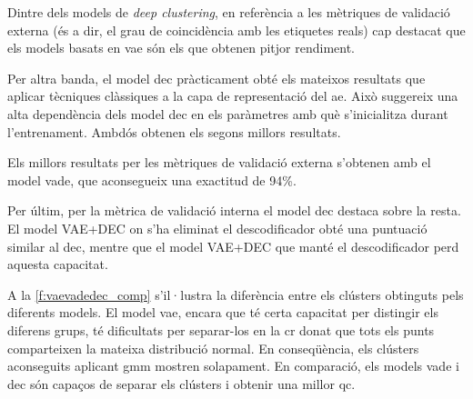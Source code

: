 \documentclass[CAT,BIB]{TFUOC}%
\begin{document}
        Dintre dels models de \textit{deep clustering},
        en referència a les mètriques de validació externa
        (és a dir, el grau de coincidència amb les etiquetes reals)
        cap destacat que els models basats en \gls{vae}
        són els que obtenen pitjor rendiment.

        Per altra banda, el model \gls{dec} pràcticament obté els mateixos resultats
        que aplicar tècniques clàssiques a la capa de representació del \gls{ae}.
        Això suggereix una alta dependència dels model \gls{dec}
        en els paràmetres amb què s'inicialitza durant l'entrenament.
        Ambdós obtenen els segons millors resultats.

        Els millors resultats per les mètriques de validació externa
        s'obtenen amb el model \gls{vade},
        que aconsegueix una exactitud de 94\%.

        Per últim, per la mètrica de validació interna
        el model \gls{dec} destaca sobre la resta.
        El model VAE+DEC on s'ha eliminat el descodificador
        obté una puntuació similar al \gls{dec},
        mentre que el model VAE+DEC que manté el descodificador
        perd aquesta capacitat.

        A la \cref{f:vaevadedec_comp} s'il·lustra
        la diferència entre els clústers obtinguts pels diferents models.
        El model \gls{vae}, encara que té certa capacitat per distingir els diferens grups,
        té dificultats per separar-los en la \gls{cr}
        donat que tots els punts comparteixen la mateixa distribució normal.
        En conseqüència, els clústers aconseguits aplicant \gls{gmm}
        mostren solapament.
        En comparació, els models \gls{vade} i \gls{dec}
        són capaços de separar els clústers i obtenir una millor \gls{qc}.
\end{document}

